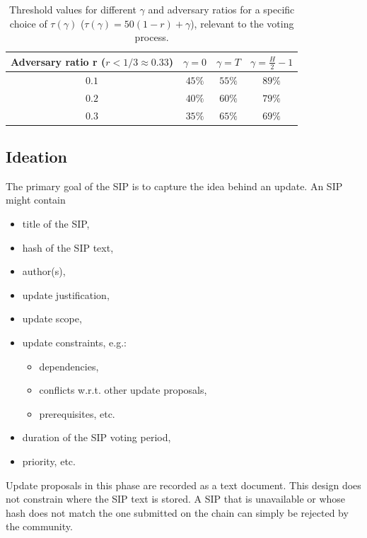 \documentclass[11pt,a4paper]{article}
\begin{document}
\begin{table}[h!]
	\centering
	\begin{tabular}{ | c | c | c | c |}
		\hline
		Adversary ratio r ($r < 1/3 \approx 0.33$) & $\gamma = 0$ & $\gamma =
		T$ & $\gamma = \frac{H}{2} - 1$ \\
		\hline
		$0.1$ & $45\%$ & $55\%$ & $89\%$ \\
		$0.2$ & $40\%$ & $60\%$ & $79\%$ \\
		$0.3$ & $35\%$ & $65\%$ & $69\%$ \\
		\hline
	\end{tabular}
	\caption{Threshold values for different $\gamma$ and adversary
		ratios for a specific choice of $\tau(\gamma)$ ($\tau(\gamma) =
		50(1-r)+\gamma$), relevant to the voting
		process.}
	\label{table:examples}
\end{table}

\subsection{Ideation}
\label{sec:ideation}

The primary goal of the SIP is to capture the idea behind an update.
An SIP might contain
\begin{itemize}
\item title of the SIP,
\item hash of the SIP text,
\item author(s),
\item update justification,
\item update scope,
\item update constraints, e.g.:
  \begin{itemize}
  \item dependencies,
  \item conflicts w.r.t. other update proposals,
  \item prerequisites, etc.
  \end{itemize}
\item duration of the SIP voting period,
\item priority, etc.
\end{itemize}

Update proposals in this phase are recorded as a text document.
This design does not constrain where the SIP text is stored. A SIP that is
unavailable or whose hash does not match the one submitted on the chain can
simply be rejected by the community.
\end{document}
